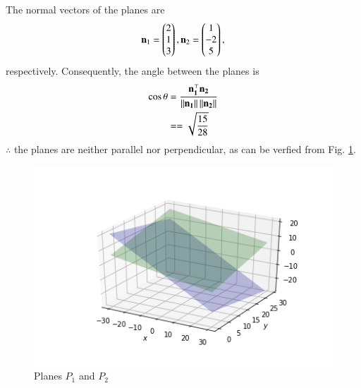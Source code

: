 The normal vectors of the planes are 
\begin{equation}
 \mathbf n_1=\begin{pmatrix}2\\1\\3\end{pmatrix},
 \mathbf n_2 =\begin{pmatrix}1\\-2\\5\end{pmatrix},
\end{equation} respectively.
Consequently, the angle between the planes is 
%
\begin{align}
    \cos\theta &= \frac{\mathbf{n_1^\top}\mathbf{n_2}}{\left\lVert\mathbf{n_1}\right\rVert\left\lVert\mathbf{n_2}\right\rVert}\\
&==\sqrt{\frac{15}{28}}
    \label{linform/43/b/eq9}
\end{align} 
$\therefore$ the planes  are neither parallel nor perpendicular, as can be verfied from 
Fig. \ref{linform/43/b/fig:1}.
%
\begin{figure}[!ht]
\centering
    \includegraphics[width= \columnwidth]{solutions/su2021/2/43/b/assignment4.png}
    \caption{Planes $P_1$ and $P_2$} \label{linform/43/b/fig:1}
\end{figure}
